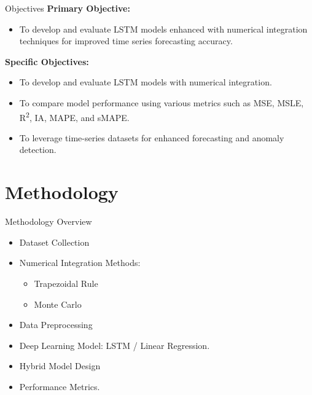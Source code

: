 \documentclass[10pt]{beamer}
\begin{document}
\begin{frame}{Objectives}
    \textbf{Primary Objective:}
    \begin{itemize}
        \item To develop and evaluate LSTM models enhanced with numerical integration techniques for improved time series forecasting accuracy.
    \end{itemize}

    \singlespacing

    \textbf{Specific Objectives:}
    \begin{itemize}
        \item To develop and evaluate LSTM models with numerical integration.
        \item To compare model performance using various metrics such as MSE, MSLE, R\textsuperscript{2}, IA, MAPE, and sMAPE.
        \item To leverage time-series datasets for enhanced forecasting and anomaly detection.
    \end{itemize}
\end{frame}

\section{Methodology}
\begin{frame}{Methodology Overview}
    \begin{itemize}
        \item Dataset Collection
        \item Numerical Integration Methods: 
        \begin{itemize}
            \item Trapezoidal Rule
            \item Monte Carlo
        \end{itemize}
        \item Data Preprocessing
            \item Deep Learning Model: LSTM / Linear Regression.
            \item Hybrid Model Design
            \item Performance Metrics.
    \end{itemize}
\end{frame}
\end{document}
